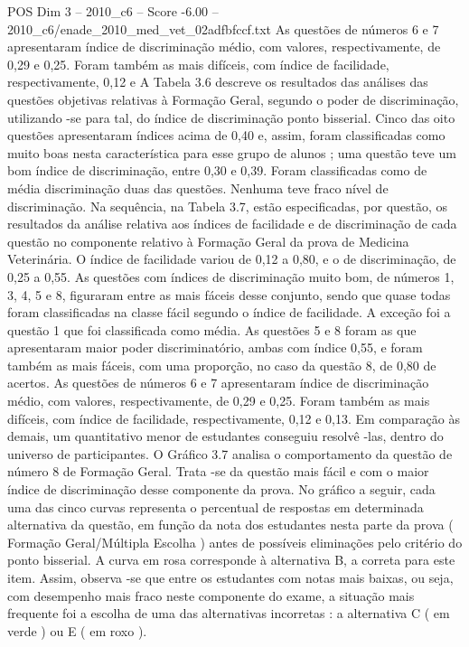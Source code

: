 \begin{textsample}{POS Dim 3 – 2010\_c6 – Score -6.00 – 2010\_c6/enade\_2010\_med\_vet\_02adfbfccf.txt}
As questões de números 6 e 7 apresentaram índice de discriminação médio, com valores, respectivamente, de 0,29 e 0,25.
Foram também as mais difíceis, com índice de facilidade, respectivamente, 0,12 e A Tabela 3.6 descreve os resultados das análises das questões objetivas relativas à Formação Geral, segundo o poder de discriminação, utilizando -se para tal, do índice de discriminação ponto bisserial.
Cinco das oito questões apresentaram índices acima de 0,40 e, assim, foram classificadas como muito boas nesta característica para esse grupo de alunos ; uma questão teve um bom índice de discriminação, entre 0,30 e 0,39.
Foram classificadas como de média discriminação duas das questões.
Nenhuma teve fraco nível de discriminação.
Na sequência, na Tabela 3.7, estão especificadas, por questão, os resultados da análise relativa aos índices de facilidade e de discriminação de cada questão no componente relativo à Formação Geral da prova de Medicina Veterinária.
O índice de facilidade variou de 0,12 a 0,80, e o de discriminação, de 0,25 a 0,55.
As questões com índices de discriminação muito bom, de números 1, 3, 4, 5 e 8, figuraram entre as mais fáceis desse conjunto, sendo que quase todas foram classificadas na classe fácil segundo o índice de facilidade.
A exceção foi a questão 1 que foi classificada como média.
As questões 5 e 8 foram as que apresentaram maior poder discriminatório, ambas com índice 0,55, e foram também as mais fáceis, com uma proporção, no caso da questão 8, de 0,80 de acertos.
As questões de números 6 e 7 apresentaram índice de discriminação médio, com valores, respectivamente, de 0,29 e 0,25.
Foram também as mais difíceis, com índice de facilidade, respectivamente, 0,12 e 0,13.
Em comparação às demais, um quantitativo menor de estudantes conseguiu resolvê -las, dentro do universo de participantes.
O Gráfico 3.7 analisa o comportamento da questão de número 8 de Formação Geral.
Trata -se da questão mais fácil e com o maior índice de discriminação desse componente da prova.
No gráfico a seguir, cada uma das cinco curvas representa o percentual de respostas em determinada alternativa da questão, em função da nota dos estudantes nesta parte da prova ( Formação Geral/Múltipla Escolha ) antes de possíveis eliminações pelo critério do ponto bisserial.
A curva em rosa corresponde à alternativa B, a correta para este item.
Assim, observa -se que entre os estudantes com notas mais baixas, ou seja, com desempenho mais fraco neste componente do exame, a situação mais frequente foi a escolha de uma das alternativas incorretas : a alternativa C ( em verde ) ou E ( em roxo ).

\end{textsample}
